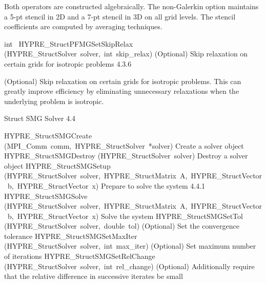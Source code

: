 \documentclass{article}
\begin{document}
\begin{cxxentry}
\begin{cxxentry}
\begin{cxxfunction}
\begin{cxxdoc}
Both operators are constructed algebraically.  The non-Galerkin option
maintains a 5-pt stencil in 2D and a 7-pt stencil in 3D on all grid levels.
The stencil coefficients are computed by averaging techniques.
\end{cxxdoc}
\end{cxxfunction}
\begin{cxxfunction}
{int\ }
        {HYPRE\_StructPFMGSetSkipRelax}
        {(HYPRE\_StructSolver\ solver,\ int\ skip\_relax)}
        {
(Optional) Skip relaxation on certain grids for isotropic problems}
        {4.3.6}
\begin{cxxdoc}

(Optional) Skip relaxation on certain grids for isotropic problems.  This can
greatly improve efficiency by eliminating unnecessary relaxations when the
underlying problem is isotropic.
\end{cxxdoc}
\end{cxxfunction}
\end{cxxentry}
\begin{cxxentry}
{}
        {Struct SMG Solver}
        {}
        {
}
        {4.4}
\begin{cxxnames}
        {HYPRE\_StructSMGCreate}
        {(MPI\_Comm\ comm,\ HYPRE\_StructSolver\ *solver)}
        {
Create a solver object}
        {}
\label{cxx.4.4.4}
        {HYPRE\_StructSMGDestroy}
        {(HYPRE\_StructSolver\ solver)}
        {
Destroy a solver object}
        {}
\label{cxx.4.4.5}
        {HYPRE\_StructSMGSetup}
        {(HYPRE\_StructSolver\ solver,\ HYPRE\_StructMatrix\ A,\ HYPRE\_StructVector\ b,\ HYPRE\_StructVector\ x)}
        {
Prepare to solve the system}
        {4.4.1}
        {HYPRE\_StructSMGSolve}
        {(HYPRE\_StructSolver\ solver,\ HYPRE\_StructMatrix\ A,\ HYPRE\_StructVector\ b,\ HYPRE\_StructVector\ x)}
        {
Solve the system}
        {}
\label{cxx.4.4.6}
        {HYPRE\_StructSMGSetTol}
        {(HYPRE\_StructSolver\ solver,\ double\ tol)}
        {
(Optional) Set the convergence tolerance}
        {}
\label{cxx.4.4.7}
        {HYPRE\_StructSMGSetMaxIter}
        {(HYPRE\_StructSolver\ solver,\ int\ max\_iter)}
        {
(Optional) Set maximum number of iterations}
        {}
\label{cxx.4.4.8}
        {HYPRE\_StructSMGSetRelChange}
        {(HYPRE\_StructSolver\ solver,\ int\ rel\_change)}
        {
(Optional) Additionally require that the relative difference in
successive iterates be small}
        {}
\label{cxx.4.4.9}

\end{cxxnames}
\end{cxxentry}
\end{cxxentry}
\end{document}
